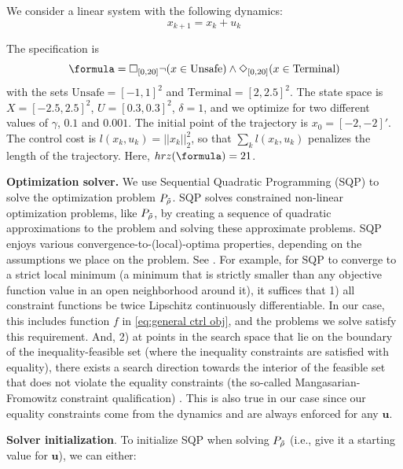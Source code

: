 We consider a linear system with the following dynamics:
\begin{equation}
\label{eq:PointMass}
x_{k+1} = x_k + u_k
\end{equation}

The specification is 
\[\formula = \always_{[0,20]} \neg (x \in \text{Unsafe}) \land \eventually_{[0,20]} (x \in \text{Terminal})\]
with the sets $\text{Unsafe}=[-1,1]^2$ and $\text{Terminal}=[2,2.5]^2$. 
The state space is $X=[-2.5,2.5]^2$, $U=[0.3,0.3]^2$, $\delta=1$, and we optimize for two different values of $\gamma$, $0.1$ and $0.001$. 
The initial point of the trajectory is $x_0=[-2,-2]'$. 
The control cost is $l(x_k,u_k) = ||x_k||_{2}^2$, so that $\sum_kl(x_k,u_k)$ penalizes the length of the trajectory. Here, $hrz(\formula) = 21$.

\textbf{Optimization solver.}
We use Sequential Quadratic Programming (SQP) to solve the optimization problem $P_{\tilde{\rho}}$.
SQP solves constrained non-linear optimization problems, like $P_{\tilde{\rho}}$, by creating a sequence of quadratic approximations to the problem and solving these approximate problems.
SQP enjoys various convergence-to-(local)-optima properties, depending on the assumptions we place on the problem. 
See \cite[Section 2.9]{Polak97_Optim}.
For example, for SQP to converge to a strict local minimum (a minimum that is strictly smaller than any objective function value in an open neighborhood around it), it suffices that 
1) all constraint functions be twice Lipschitz continuously differentiable. 
In our case, this includes function $f$ in \eqref{eq:general ctrl obj}, and the problems we solve satisfy this requirement.
And, 
2) at points in the search space that lie on the boundary of the inequality-feasible set (where the inequality constraints are satisfied with equality), there exists a search direction towards the interior of the feasible set that does not violate the equality constraints (the so-called Mangasarian-Fromowitz constraint qualification) \cite[Assumption 2.9.1]{Polak97_Optim}.
This is also true in our case since our equality constraints come from the dynamics and are always enforced for any $\mathbf{u}$.

\textbf{Solver initialization}.
To initialize SQP when solving $P_{\tilde{\rho}}$ (i.e., give it a starting value for $\mathbf{u}$), we can either:

